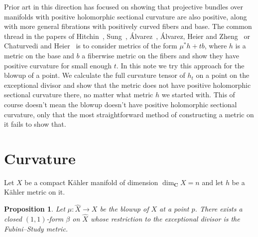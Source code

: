 \documentclass[10pt,a4paper]{amsart}
\newtheorem{prop}[theo]{Proposition}
\def\CC{\mathbf{C}}
\def\fs{b}
\def\hsc{holomorphic sectional curvature}
\def\bl#1{\widehat{#1}}
\def\blX{\bl{X}}
\begin{document}
Prior art in this direction has focused on showing that projective bundles
over manifolds with positive \hsc{} are also positive, along with more
general fibrations with positively curved fibers and base.
The common thread in the papers of
Hitchin~\cite{hitchin1975curvature},
Sung~\cite{sung1997kahler},
\'Alvarez~\cite{alvarez2016positive},
\'Alvarez,
Heier and Zheng~\cite{alvarez2018projectivized} or Chaturvedi and
Heier~\cite{chaturvedi2020hermitian}
is to consider metrics of the form $\mu^* h + t \fs$, where $h$ is a metric
on the base and $\fs$ a fiberwise metric on the fibers and show they have
positive curvature for small enough $t$.
In this note we try this approach for the blowup of a point.
We calculate the full curvature tensor of $h_t$ on a point on the exceptional
divisor and show that the metric
does not have positive \hsc{} there, no matter what metric $h$ we started with.
This of course doesn't mean the blowup doesn't have positive \hsc{}, only that
the most straightforward method of constructing a metric on it fails to show that.





\section{Curvature}

Let $X$ be a compact K\"ahler manifold of dimension $\dim_{\CC} X = n$
and let $h$ be a K\"ahler metric on it.


\begin{prop}
\label{prop:fs}
Let $\mu : \bl X \to X$ be the blowup of $X$ at a point $p$.
There exists a closed $(1,1)$-form $\beta$ on $\blX$ whose restriction to
the exceptional divisor is the Fubini--Study metric.
\end{prop}
\end{document}
